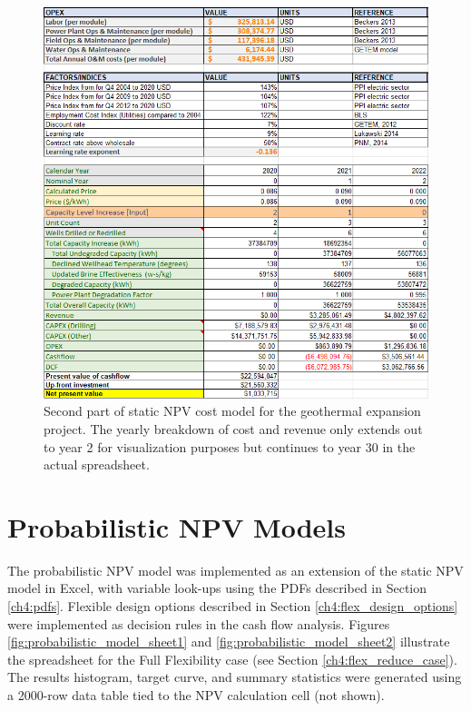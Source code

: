 \begin{figure}[H]
\centering
\includegraphics[width=\textwidth]{templates/images/Figure-Static_Model_SheetB.png}
\caption[Static cost model worksheet (part 2)]{Second part of static NPV cost model for the geothermal expansion project. The yearly breakdown of cost and revenue only extends out to year 2 for visualization purposes but continues to year 30 in the actual spreadsheet.}
\label{fig:static_model_sheet2}
\end{figure}
\pagebreak
\section{Probabilistic NPV Models}\label{app:B_flex_models}
The probabilistic NPV model was implemented as an extension of the static NPV model in Excel, with variable look-ups using the PDFs described in Section \ref{ch4:pdfs}. Flexible design options described in Section \ref{ch4:flex_design_options} were implemented as decision rules in the cash flow analysis. Figures \ref{fig:probabilistic_model_sheet1} and \ref{fig:probabilistic_model_sheet2} illustrate the spreadsheet for the Full Flexibility case (see Section \ref{ch4:flex_reduce_case}). The results histogram, target curve, and summary statistics were generated using a 2000-row data table tied to the NPV calculation cell (not shown).
\vfill
\pagebreak

